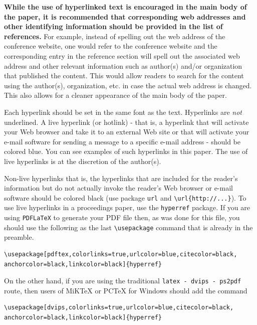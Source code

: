 \documentclass{scspaperproc}
\theoremstyle{scsthe}
\begin{document}
    \textbf{While the use of hyperlinked text is encouraged in the main body of the paper, it is recommended that corresponding web addresses and other identifying information should be provided in the list of references.} For example, instead of spelling out the web address of the conference website, one would refer to the conference website and the corresponding entry in the reference section will spell out the associated web address and other relevant information such as author(s) and/or organization that published the content. This would allow readers to search for the content using the author(s), organization, etc. in case the actual web address is changed. This also allows for a cleaner appearance of the main body of the paper.

    Each hyperlink should be set in the same font as the text. Hyperlinks are \emph{not} underlined. A live hyperlink (or hotlink) - that is, a hyperlink that will activate your Web browser and take it to an external Web site or that will activate your e-mail software for sending a message to a specific e-mail address - should be colored blue. You can see examples of such hyperlinks in this paper. The use of live hyperlinks is at the discretion of the author(s).

    Non-live hyperlinks that is, the hyperlinks that are included for the reader’s information but do not actually invoke the reader’s Web browser or e-mail software should be colored black (use package \texttt{url} and \verb+\url{http://...}+). To use live hyperlinks in a proceedings paper, use the \texttt{hyperref} package. If you are using \texttt{PDFLaTeX} to generate your PDF file then, as was done for this file, you should use the following as the last \verb+\usepackage+ command that is already in the preamble.

    \begin{verbatim}
\usepackage[pdftex,colorlinks=true,urlcolor=blue,citecolor=black,
anchorcolor=black,linkcolor=black]{hyperref}
    \end{verbatim}

    On the other hand, if you are using the traditional \texttt{latex - dvips - ps2pdf} route, then users of MiKTeX or PCTeX for Windows should add the command

    \begin{verbatim}
\usepackage[dvips,colorlinks=true,urlcolor=blue,citecolor=black,
anchorcolor=black,linkcolor=black]{hyperref}
    \end{verbatim}
\end{document}
